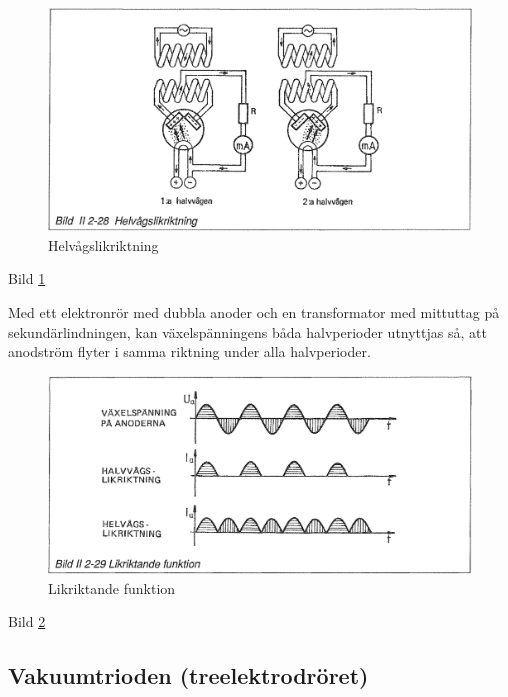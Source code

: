 \begin{figure}[h]
\begin{center}
\includegraphics[width=14cm]{images/bild_2_2-28}
\caption{Helvågslikriktning}
\label{fig:BildII2-28}
\end{center}
\end{figure}

Bild \ref{fig:BildII2-28}

Med ett elektronrör med dubbla anoder och en transformator med mittuttag på
sekundärlindningen, kan växelspänningens båda halvperioder utnyttjas så, att
anodström flyter i samma riktning under alla halvperioder.

\begin{figure}[h]
\begin{center}
\includegraphics[width=14cm]{images/bild_2_2-29}
\caption{Likriktande funktion}
\label{fig:BildII2-29}
\end{center}
\end{figure}

Bild \ref{fig:BildII2-29}

\subsection{Vakuumtrioden (treelektrodröret)}

